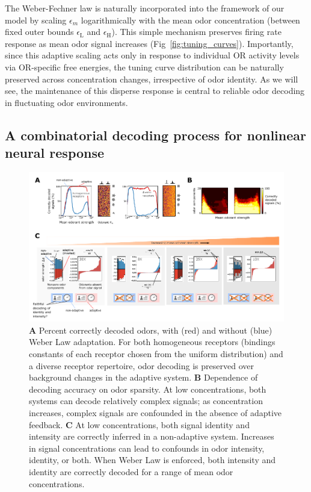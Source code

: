 The Weber-Fechner law is naturally incorporated into the framework of our model by scaling $\epsilon_m$ logarithmically with the mean odor concentration (between fixed outer bounds $\epsilon_{\text {L}}$ and $\epsilon_{\text {H}}$). This simple mechanism preserves firing rate response as mean odor signal increases (Fig~\ref{fig:tuning_curves}). Importantly, since this adaptive scaling acts only in response to individual OR activity levels via OR-specific free energies, the tuning curve distribution can be naturally preserved across concentration changes, irrespective of odor identity. As we will see, the maintenance of this disperse response is central to reliable odor decoding in fluctuating odor environments. 


\subsection{A combinatorial decoding process for nonlinear neural response}

\begin{figure}
	\includegraphics[width=\textwidth]{figures/Figures_signal_decoding_weber_law}
	\caption{\footnotesize{\textbf{A} Percent correctly decoded odors, with (red) and without (blue) Weber Law adaptation. For both homogeneous receptors (bindings constants of each receptor chosen from the uniform distribution) and a diverse receptor repertoire, odor decoding is preserved over background changes in the adaptive system. \textbf{B} Dependence of decoding accuracy on odor sparsity. At low concentrations, both systems can decode relatively complex signals; as concentration increases, complex signals are confounded in the absence of adaptive feedback. \textbf{C} At low concentrations, both signal identity and intensity are correctly inferred in a non-adaptive system. Increases in signal concentrations can lead to confounds in odor intensity, identity, or both. When Weber Law is enforced, both intensity and identity are correctly decoded for a range of mean odor concentrations.}}
\end{figure}


